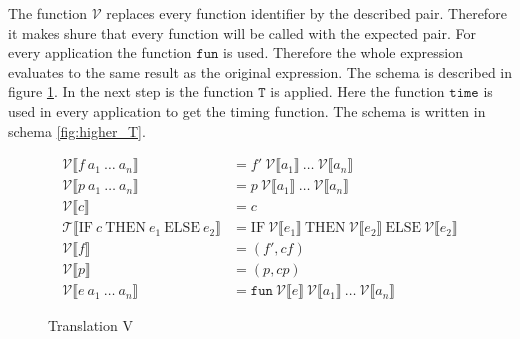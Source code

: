 The function $\mathcal{V}$ replaces every function identifier by the described pair.
Therefore it makes shure that every function will be called with the expected pair.
For every application the function $\texttt{fun}$ is used.
Therefore the whole expression evaluates to the same result as the original expression.
The schema is described in figure \ref{fig:higher_V}.
In the next step is the function $\texttt{T}$ is applied.
Here the function $\texttt{time}$ is used in every application to get the timing function.
The schema is written in schema \ref{fig:higher_T}.
\begin{figure}
  \begin{align*}
    \mathcal{V}\llbracket f\ a_{1}\ \dots\ a_{n}\rrbracket &= f'\ \mathcal{V}\llbracket a_{1}\rrbracket\ \dots \ \mathcal{V}\llbracket a_{n}\rrbracket\\
    \mathcal{V}\llbracket p\ a_{1}\ \dots\ a_{n}\rrbracket &= p\ \mathcal{V}\llbracket a_{1}\rrbracket\ \dots \ \mathcal{V}\llbracket a_{n}\rrbracket\\
    \mathcal{V}\llbracket c \rrbracket &= c\\
    \mathcal{T}\llbracket \text{IF}\ c\ \text{THEN}\ e_{1}\ \text{ELSE}\ e_{2}\rrbracket &= \text{IF}\  \mathcal{V}\llbracket e_{1}\rrbracket\ \text{THEN}\ \mathcal{V}\llbracket e_{2}\rrbracket\ \text{ELSE}\ \mathcal{V}\llbracket e_{2}\rrbracket\\
    \mathcal{V}\llbracket f\rrbracket &= (f',cf)\\
    \mathcal{V}\llbracket p\rrbracket &= (p,cp)\\
    \mathcal{V}\llbracket e\ a_{1}\ \dots\ a_{n}\rrbracket &= \texttt{fun}\ \mathcal{V}\llbracket e\rrbracket\ \mathcal{V}\llbracket a_{1} \rrbracket\ \dots\ \mathcal{V}\llbracket a_{n}\rrbracket
  \end{align*}
  \caption{Translation V}
  \label{fig:higher_V}
\end{figure}
